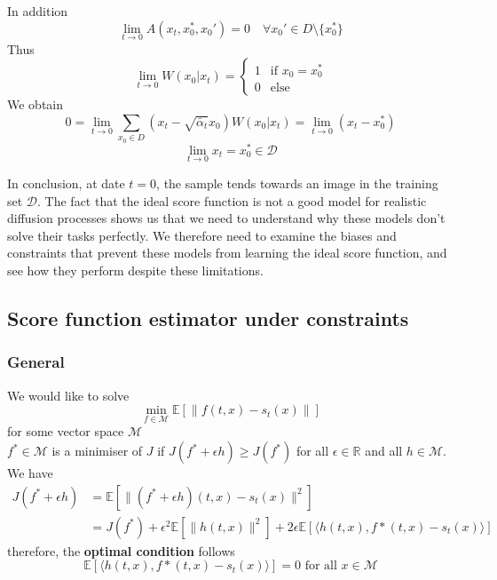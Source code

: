 \documentclass[a4paper,10pt]{article}
\theoremstyle{definition} %
\theoremstyle{definition} %
\theoremstyle{definition} %
\theoremstyle{definition} %
\newcommand{\R}{\mathbb{R}}
\newcommand{\E}[1]{\mathbb{E} \left[ {#1} \right] }
\newcommand{\0}{\boldsymbol{0}}
\begin{document}
In addition
\begin{equation*}
    \lim\limits_{t \to 0} A(x_t, x_0^*, x_0') = 0 \quad \forall x_0' \in D \setminus \{x_0^*\}
\end{equation*}
Thus
\[
\lim\limits_{t \to 0} W(x_0 | x_t) =
\begin{cases} 
1 & \text{if } x_0 = x_0^* \\
0 & \text{else}
\end{cases}
\]
We obtain
\[
0 = \lim\limits_{t \to 0} \sum\limits_{x_0 \in D} (x_t - \sqrt{\bar{\alpha}_t} x_0) W(x_0 | x_t) = \lim\limits_{t \to 0} (x_t - x_0^*)
\]
\begin{equation*}
    \lim\limits_{t\rightarrow 0} x_t = x_0^* \in \mathcal{D}
\end{equation*}

In conclusion, at date $t = 0$, the sample tends towards an image in the training set $\mathcal{D}$. The fact that the ideal score function is not a good model for realistic diffusion processes shows us that we need to understand why these models don't solve their tasks perfectly. We therefore need to examine the biases and constraints that prevent these models from learning the ideal score function, and see how they perform despite these limitations.
\subsection{Score function estimator under constraints}
\subsubsection{General}
We would like to solve
\begin{equation*}
    \min_{f\in\mathcal{M}} \E{\| f(t,x)-s_t(x)\|}
\end{equation*}
for some vector space $\mathcal{M}$\\
$f^* \in \mathcal{M}$ is a minimiser of $J$ if $J(f^*+\epsilon h) \geq J(f^*)$ for all $\epsilon \in \R$ and all $h\in \mathcal{M}$. We have
\begin{align*}
    J(f^*+\epsilon h) &= \E{\|(f^*+\epsilon h)(t,x)-s_t(x)\|^2}\\
    & = J(f^*)+\epsilon^2\E{\|h(t,x)\|^2}+2\epsilon\E{\langle h(t,x),f*(t,x) - s_t(x) \rangle}
\end{align*}
therefore, the \textbf{optimal condition} follows
\begin{equation}\label{eq:optimal_condition_score_function}
    \E{\langle h(t,x),f*(t,x) - s_t(x) \rangle} = 0 \text{ for all } x \in \mathcal{M}
\end{equation}
\end{document}
